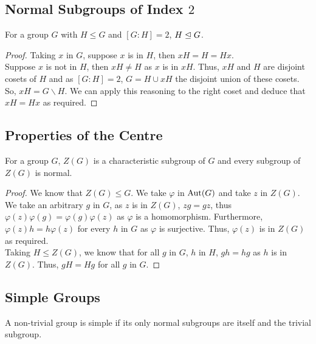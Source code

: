 \subsection{Normal Subgroups of Index $2$}

For a group $G$ with $H \leq G$ and $[G : H] = 2$, $H \trianglelefteq G$.

\begin{proof}
    Taking $x$ in $G$, suppose $x$ is in $H$, then $xH = H = Hx$.
    \\[\baselineskip]
    Suppose $x$ is not in $H$, then $xH \neq H$ as $x$ is in $xH$.
    Thus, $xH$ and $H$ are disjoint cosets of $H$ and as $[G : H] = 2$, 
    $G = H \cup xH$ the disjoint union of these cosets. So, 
    $xH = G \backslash H$. We can apply this reasoning to the right coset
    and deduce that $xH = Hx$ as required.
\end{proof}

\subsection{Properties of the Centre}

For a group $G$, $Z(G)$ is a characteristic subgroup of $G$ and every
subgroup of $Z(G)$ is normal.

\begin{proof}
    We know that $Z(G) \leq G$. We take $\varphi$ in $\operatorname{Aut}(G)$ and take $z$
    in $Z(G)$. We take an arbitrary $g$ in $G$, as $z$ is in $Z(G)$, 
    $zg = gz$, thus $\varphi(z)\varphi(g) = \varphi(g)\varphi(z)$ as 
    $\varphi$ is a homomorphism. Furthermore, $\varphi(z)h = h\varphi(z)$
    for every $h$ in $G$ as $\varphi$ is surjective. Thus, $\varphi(z)$
    is in $Z(G)$ as required.
    \\[\baselineskip]
    Taking $H \leq Z(G)$, we know that for all $g$ in $G$, $h$ in $H$,
    $gh = hg$ as $h$ is in $Z(G)$. Thus, $gH = Hg$ for all $g$ in $G$.
\end{proof}

\subsection{Simple Groups}

A non-trivial group is simple if its only normal subgroups are itself 
and the trivial subgroup.
